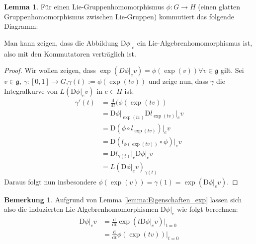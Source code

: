 \documentclass[a4paper]{scrreprt}
\numberwithin{equation}{chapter}
\newcommand{\D}{\mathrm{d}}
\newcommand{\DD}{\mathrm{D}}
\theoremstyle{definition}
\newtheorem{lemma}[defn]{Lemma}
\newtheorem{bem}[defn]{Bemerkung}
\begin{document}
		\begin{lemma}
			Für einen Lie-Gruppenhomomorphismus $\phi\colon G\rightarrow H$ (einen glatten Gruppenhomomorphismus zwischen Lie-Gruppen) kommutiert das folgende Diagramm:
			\begin{center}
			\end{center}
			Man kann zeigen, dass die Abbildung $\DD\phi\vert_e$ ein Lie-Algebrenhomomorphismus ist, also mit den Kommutatoren verträglich ist.
			\begin{proof}
				Wir wollen zeigen, dass $\exp(D\phi\vert_e v)=\phi(\exp(v))\forall v\in\mathfrak{g}$ gilt. Sei $v\in\mathfrak{g}$, ${\gamma\colon [0,1]\rightarrow G}$,$ \gamma(t):=\phi(\exp(tv))$ und zeige nun, dass $\gamma$ die Integralkurve von $L(\DD\phi\vert_e v)$ in $e\in H$ ist:
				\begin{align*}
					\gamma'(t)&=\frac{\D}{\D t}(\phi(\exp(tv))\\
					&=\DD\phi\vert_{\exp(tv)}\DD l_{\exp(tv)}\vert_e v\\
					&=\DD(\phi\circ l_{\exp(tv)})\vert_e v\\
					&=\DD(l_{\phi(\exp(tv))}\circ\phi)\vert_e v\\
					&=\DD l_{\gamma(t)}\vert_e\DD\phi\vert_ev\\
					&=L(\DD\phi\vert_e v)_{\gamma(t)}
				\end{align*}
				Daraus folgt nun insbesondere $\phi(\exp(v))=\gamma(1)=\exp(\DD\phi\vert_e v)$.
			\end{proof}
		\end{lemma}
		\begin{bem}\label{bem:exp_induziert_Abbildungen}
			Aufgrund von Lemma \ref{lemma:Eigenschaften_exp} lassen sich also die induzierten Lie-Algebrenhomomorphismen $\DD\phi\vert_e$ wie folgt berechnen:
			\begin{align*}
				\DD\phi\vert_e v&=\frac{\D}{\D t}\exp(t \DD\phi\vert_e v)\Big\vert_{t=0}\\
				&=\frac{\D}{\D t}\phi(\exp(tv))\Big\vert_{t=0}
			\end{align*}
		\end{bem}
\end{document}
